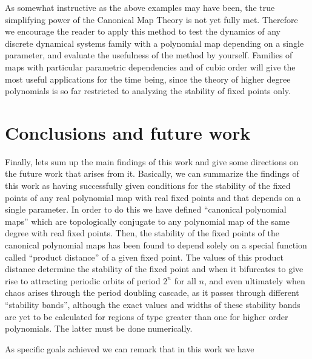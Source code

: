 \documentclass[10pt,twoside,titlepage]{book}
\numberwithin{equation}{chapter}
\numberwithin{figure}{chapter}
\numberwithin{table}{chapter}
\theoremstyle{plain}%
\theoremstyle{definition}
\theoremstyle{remark}
\begin{document}
As somewhat instructive as the above examples may have been, the true simplifying power of the Canonical Map Theory is not yet fully met. Therefore we encourage the reader to apply this method to test the dynamics of any discrete dynamical systems family with a polynomial map depending on a single parameter, and evaluate the usefulness of the method by yourself. Families of maps with particular parametric dependencies and of cubic order will give the most useful applications for the time being, since the theory of higher degree polynomials is so far restricted to analyzing the stability of fixed points only.

\FloatBarrier

\chapter{Conclusions and future work}
\label{cha:Conclusions}

Finally, lets sum up the main findings of this work and give some directions on the future work that arises from it. Basically, we can summarize the findings of this work as having successfully given conditions for the stability of the fixed points of any real polynomial map with real fixed points and that depends on a single parameter. In order to do this we have defined ``canonical polynomial maps'' which are topologically conjugate to any polynomial map of the same degree with real fixed points. Then, the stability of the fixed points of the canonical polynomial maps has been found to depend solely on a special function called ``product distance'' of a given fixed point. The values of this product distance determine the stability of the fixed point and when it bifurcates to give rise to attracting periodic orbits of period $2^n$ for all $n$, and even ultimately when chaos arises through the period doubling cascade, as it passes through different ``stability bands'', although the exact values and widths of these stability bands are yet to be calculated for regions of type greater than one for higher order polynomials. The latter must be done numerically.

As specific goals achieved we can remark that in this work we have
\end{document}
